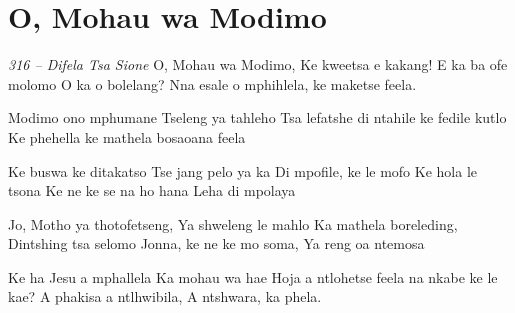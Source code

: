 \starttocol
\chapter{O, Mohau wa Modimo}
\nexttocol
\hfill{\it 316 -- Difela Tsa Sione}
\stoptocol
\starttocol
\startlines
{\sc O, Mohau} wa Modimo,
Ke kweetsa e kakang!
E ka ba ofe molomo 
O ka o bolelang?
Nna esale o mphihlela,
ke maketse feela.

Modimo ono mphumane 
Tseleng ya tahleho
Tsa lefatshe di ntahile
ke fedile kutlo
Ke phehella ke mathela 
bosaoana feela

Ke buswa ke ditakatso
Tse jang pelo ya ka
Di mpofile, ke le mofo
Ke hola le tsona
Ke ne ke se na ho hana
Leha di mpolaya
 
Jo, Motho ya thotofetseng, 
Ya shweleng le mahlo
Ka mathela boreleding, 
Dintshing tsa selomo
Jonna, ke ne ke mo soma,
Ya reng oa ntemosa

Ke ha Jesu a mphallela 
Ka mohau wa hae
Hoja a ntlohetse feela
na nkabe ke le kae?
A phakisa a ntlhwibila,
A ntshwara, ka phela.
\stoplines
\nexttocol

\stoptocol

